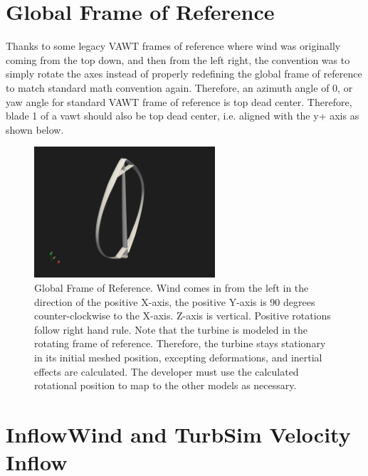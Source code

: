 \documentclass[11pt]{article}
\begin{document}

\section{Global Frame of Reference}

Thanks to some legacy VAWT frames of reference where wind was originally coming from the top down, and then from the left right, the convention was to simply rotate the axes instead of properly redefining the global frame of reference to match standard math convention again.  Therefore, an azimuth angle of 0, or yaw angle for standard VAWT frame of reference is top dead center.  Therefore, blade 1 of a vawt should also be top dead center, i.e. aligned with the y+ axis as shown below.

\begin{figure}[H]
\centering
\vspace{-12pt}
\includegraphics[trim={4cm 4cm 10cm 3cm},clip,width=0.6\textwidth]{./figs/global_FOR3.png}
\vspace{-5pt}
\caption{Global Frame of Reference.  Wind comes in from the left in the direction of the positive X-axis, the positive Y-axis is 90 degrees counter-clockwise to the X-axis.  Z-axis is vertical.  Positive rotations follow right hand rule. Note that the turbine is modeled in the rotating frame of reference.  Therefore, the turbine stays stationary in its initial meshed position, excepting deformations, and inertial effects are calculated.  The developer must use the calculated rotational position to map to the other models as necessary.}
\label{fig:ac_velocities}
\end{figure}

\section{InflowWind and TurbSim Velocity Inflow}
\end{document}
